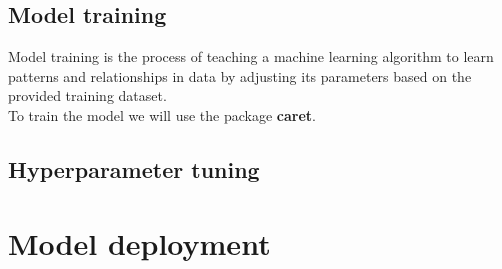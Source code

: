 \documentclass[
]{book}
\begin{document}
\hypertarget{model-training}{%
\section{Model training}\label{model-training}}

Model training is the process of teaching a machine learning algorithm to learn patterns and relationships in data by adjusting its parameters based on the provided training dataset.\\
To train the model we will use the package \textbf{caret}.

\hypertarget{hyperparameter-tuning}{%
\section{Hyperparameter tuning}\label{hyperparameter-tuning}}

\hypertarget{model-deployment}{%
\chapter{Model deployment}\label{model-deployment}}

  
\end{document}
